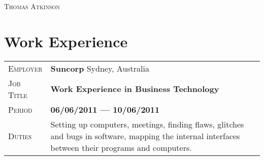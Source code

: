 \documentclass[a4paper, oneside, final]{scrartcl} %
\newcommand{\gray}{\rowcolor[gray]{.90}} %
\newcommand{\lightgrey}{\rowcolor[gray]{.95}} %
\begin{document}
\begin{center} %


{\fontsize{36}{36}\selectfont\scshape Thomas Atkinson} %

\vspace{1.5cm} %






\section{Work Experience}


\newif\ifsound{}

\newif\ifit{}
\ittrue{}

\newif\iftemp{}

\ifit{}
\begin{tabularx}{0.97\linewidth}{>{\raggedleft\scshape}p{2cm}X}
  \gray{} Employer & \textbf{Suncorp} \hfill Sydney, Australia\\
  \gray{} Job Title & \textbf{Work Experience in Business Technology}\\
  \gray{} Period & \textbf{06/06/2011 --- 10/06/2011}\\
  \lightgrey{} Duties & Setting up computers, meetings, finding flaws, glitches and bugs in software, mapping the internal interfaces between their programs and computers. 
\end{tabularx}

\vspace{2pt}
\fi


\end{center}
\end{document}
